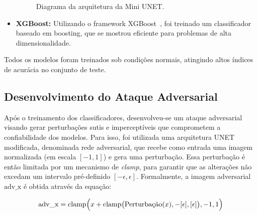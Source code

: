 \documentclass[12pt]{article}
\begin{document}
\begin{itemize}
\begin{figure}[htbp]
              \caption{Diagrama da arquitetura da Mini UNET.}
              \label{fig:mini_unet}
          \end{figure}

    \item \textbf{XGBoost:} Utilizando o framework XGBoost~\cite{Chen_2016}, foi treinado
          um classificador baseado em boosting, que se mostrou eficiente para problemas de alta
          dimensionalidade.
\end{itemize}

Todos os modelos foram treinados sob condições normais, atingindo altos índices
de acurácia no conjunto de teste.

\subsection{Desenvolvimento do Ataque Adversarial}

Após o treinamento dos classificadores, desenvolveu-se um ataque adversarial
visando gerar perturbações sutis e imperceptíveis que comprometem a
confiabilidade dos modelos. Para isso, foi utilizada uma arquitetura UNET
modificada, denominada rede adversarial, que recebe como entrada uma imagem
normalizada (em escala \([-1, 1]\)) e gera uma perturbação. Essa perturbação é
então limitada por um mecanismo de \textit{clamp}, para garantir que as
alterações não excedam um intervalo pré-definido \([-\epsilon, \epsilon]\).
Formalmente, a imagem adversarial \( \text{adv\_x} \) é obtida através da
equação:

\[
    \text{adv\_x} = \text{clamp}\Bigl(x + \text{clamp}\bigl(\text{Perturbação}(x), -[\epsilon], [\epsilon]\bigr), -1, 1\Bigr)
\]
\end{document}
